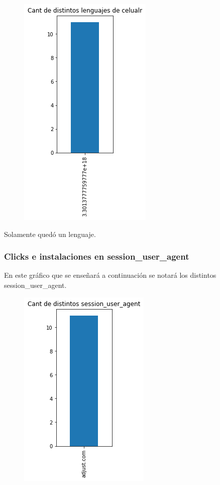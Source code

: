 \documentclass[a4paper, 12pt]{article}
\begin{document}
{{	
		\begin{figure}[H]
			\centering
			\includegraphics[scale = 0.5]{images/clicks-installs/device_language.png}
			\caption{}
		\end{figure}
	

	Solamente quedó un lenguaje.
	
	\subsubsection{Clicks e instalaciones en session\_user\_agent}
	En este gráfico que se enseñará a continuación se notará los distintos session\_user\_agent.
	
	
		\begin{figure}[H]
			\centering
			\includegraphics[scale = 0.5]{images/clicks-installs/session_user_agent.png}
			\caption{}
		\end{figure}
	
}}
\end{document}
